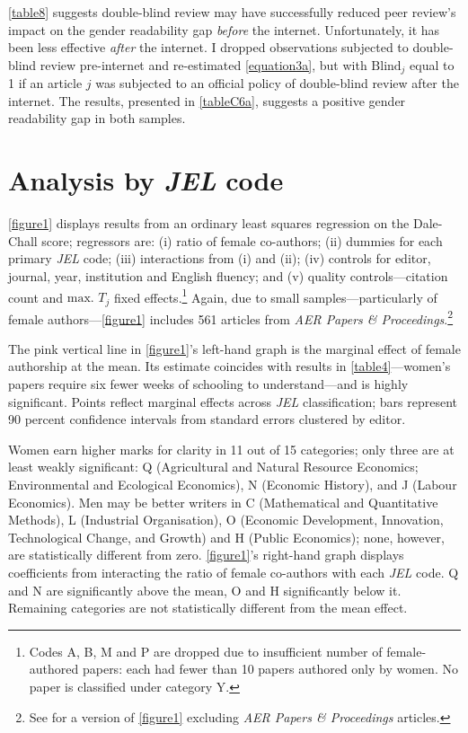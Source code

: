 \begin{appendices}
\autoref{table8} suggests double-blind review may have successfully reduced peer review's impact on the gender readability gap \emph{before} the internet. Unfortunately, it has been less effective \emph{after} the internet. I dropped observations subjected to double-blind review pre-internet and re-estimated \autoref{equation3a}, but with $\text{Blind}_j$ equal to 1 if an article $j$ was subjected to an official policy of double-blind review after the internet. The results, presented in \autoref{tableC6a}, suggests a positive gender readability gap in both samples.



\section{Analysis by \emph{JEL} code}
\label{appendixjel}

\autoref{figure1} displays results from an ordinary least squares regression on the Dale-Chall score; regressors are: (i) ratio of female co-authors; (ii) dummies for each primary \emph{JEL} code; (iii) interactions from (i) and (ii); (iv) controls for editor, journal, year, institution and English fluency; and (v) quality controls---citation count and $\text{max. }T_j$ fixed effects.\footnote{\label{footnote33}Codes A, B, M and P are dropped due to insufficient number of female-authored papers: each had fewer than 10 papers authored only by women. No paper is classified under category Y.} Again, due to small samples---particularly of female authors---\autoref{figure1} includes 561 articles from \emph{AER Papers \& Proceedings}.\footnote{See  \citet[][pp. 42--43]{Hengel2016} for a version of \autoref{figure1} excluding \emph{AER Papers \& Proceedings} articles.}



The pink vertical line in \autoref{figure1}'s left-hand graph is the marginal effect of female authorship at the mean. Its estimate coincides with results in \autoref{table4}---women's papers require six fewer weeks of schooling to understand---and is highly significant. Points reflect marginal effects across \emph{JEL} classification; bars represent 90 percent confidence intervals from standard errors clustered by editor.

Women earn higher marks for clarity in 11 out of 15 categories; only three are at least weakly significant: Q (Agricultural and Natural Resource Economics; Environmental and Ecological Economics), N (Economic History), and J (Labour Economics). Men may be better writers in C (Mathematical and Quantitative Methods), L (Industrial Organisation), O (Economic Development, Innovation, Technological Change, and Growth) and H (Public Economics); none, however, are statistically different from zero. \autoref{figure1}'s right-hand graph displays coefficients from interacting the ratio of female co-authors with each \emph{JEL} code. Q and N are significantly above the mean, O and H significantly below it. Remaining categories are not statistically different from the mean effect.


\end{appendices}
